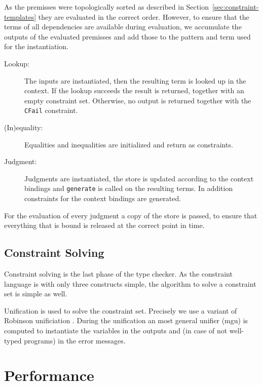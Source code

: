 As the premisses were topologically sorted as described in
Section~\ref{sec:constraint-templates} they are evaluated in the
correct order. However, to ensure that the terms of all dependencies
are available during evaluation, we accumulate the outputs of the
evaluated premisses and add those to the pattern and term used for the
instantiation.

\begin{description}
\item[Lookup:] The inputs are instantiated, then the resulting term is
  looked up in the context. If the lookup succeeds the result is
  returned, together with an empty constraint set. Otherwise, no
  output is returned together with the \verb|CFail| constraint.
\item[(In)equality:] Equalities and inequalities are initialized and
  return as constraints.
\item[Judgment:] Judgments are instantiated, the store is updated
  according to the context bindings and \verb|generate| is called on
  the resulting terms. In addition constraints for the context
  bindings are generated. 
\end{description}

For the evaluation of every judgment a copy of the store is passed, to
ensure that everything that is bound is released at the correct point
in time.



\subsection{Constraint Solving}
\label{sec:constraint-solving}
Constraint solving is the last phase of the type checker. As the
constraint language is with only three constructs simple, the
algorithm to solve a constraint set is simple as well.

Unification is used to solve the constraint set. Precisely we use a
variant of Robinson unificiation . During the
unification an most general unifier (mgu) is computed to instantiate
the variables in the outputs and (in case of not well-typed programs)
in the error messages.
\section{Performance}
\label{sec:performance}

